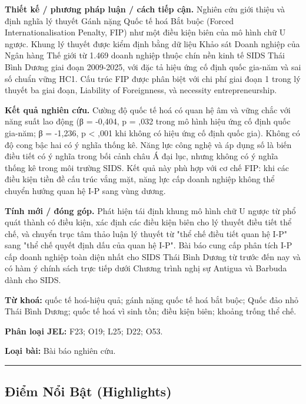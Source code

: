 \documentclass[12pt,a4paper]{article}
\begin{document}
\textbf{Thiết kế / phương pháp luận / cách tiếp cận.} Nghiên cứu giới
thiệu và định nghĩa lý thuyết Gánh nặng Quốc tế hoá Bắt buộc (Forced
Internationalisation Penalty, FIP) như một điều kiện biên của mô hình
chữ U ngược. Khung lý thuyết được kiểm định bằng dữ liệu Khảo sát Doanh
nghiệp của Ngân hàng Thế giới từ 1.469 doanh nghiệp thuộc chín nền kinh
tế SIDS Thái Bình Dương giai đoạn 2009-2025, với đặc tả hiệu ứng cố định
quốc gia-năm và sai số chuẩn vững HC1. Cấu trúc FIP được phân biệt với
chi phí giai đoạn 1 trong lý thuyết ba giai đoạn, Liability of
Foreignness, và necessity entrepreneurship.

\textbf{Kết quả nghiên cứu.} Cường độ quốc tế hoá có quan hệ âm và vững
chắc với năng suất lao động (β = -0,404, p = ,032 trong mô hình hiệu ứng
cố định quốc gia-năm; β = -1,236, p \textless{} ,001 khi không có hiệu
ứng cố định quốc gia). Không có độ cong bậc hai có ý nghĩa thống kê.
Năng lực công nghệ và áp dụng số là biến điều tiết có ý nghĩa trong bối
cảnh châu Á đại lục, nhưng không có ý nghĩa thống kê trong môi trường
SIDS. Kết quả này phù hợp với cơ chế FIP: khi các điều kiện tiền đề cấu
trúc vắng mặt, năng lực cấp doanh nghiệp không thể chuyển hướng quan hệ
I-P sang vùng dương.

\textbf{Tính mới / đóng góp.} Phát hiện tái định khung mô hình chữ U
ngược từ phổ quát thành có điều kiện, xác định các điều kiện biên cho lý
thuyết điều tiết thể chế, và chuyển trục tâm thảo luận lý thuyết từ "thể
chế điều tiết quan hệ I-P" sang "thể chế quyết định dấu của quan hệ
I-P". Bài báo cung cấp phân tích I-P cấp doanh nghiệp toàn diện nhất cho
SIDS Thái Bình Dương từ trước đến nay và có hàm ý chính sách trực tiếp
dưới Chương trình nghị sự Antigua và Barbuda dành cho SIDS.

\textbf{Từ khoá:} quốc tế hoá-hiệu quả; gánh nặng quốc tế hoá bắt buộc;
Quốc đảo nhỏ Thái Bình Dương; quốc tế hoá vì sinh tồn; điều kiện biên;
khoảng trống thể chế.

\textbf{Phân loại JEL:} F23; O19; L25; D22; O53.

\textbf{Loại bài:} Bài báo nghiên cứu.

\begin{center}\rule{0.5\linewidth}{0.5pt}\end{center}

\hypertarget{ux111iux1ec3m-nux1ed5i-bux1eadt-highlights}{%
\subsection{Điểm Nổi Bật
(Highlights)}\label{ux111iux1ec3m-nux1ed5i-bux1eadt-highlights}}
\end{document}

